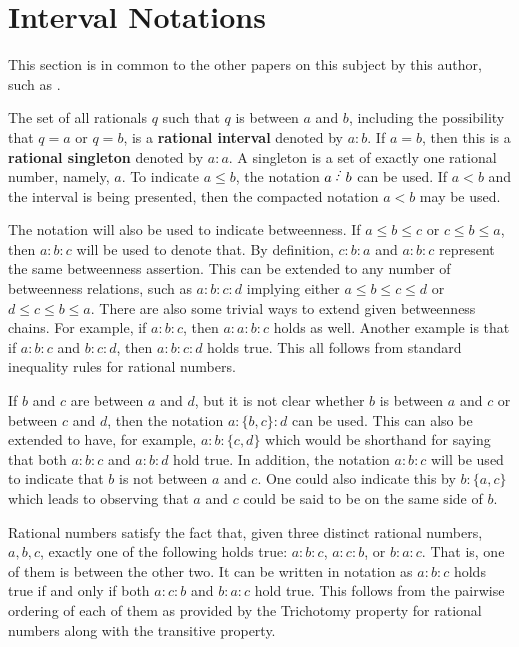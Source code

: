 \documentclass[12pt]{article}
\begin{document}
\section{Interval Notations}

This section is in common to the other papers on this subject by this author, such as \cite{taylor24dedekind}.

The set of all rationals $q$ such that $q$ is between $a$ and $b$, including the possibility that $q=a$ or $q=b$, is a \textbf{rational interval} denoted by $a:b$. If $a=b$, then this is a \textbf{rational singleton} denoted by $a:a$. A singleton is a set of exactly one rational number, namely, $a$. To indicate $a \leq b$, the notation $a \lte b$ can be used. If $a < b$ and the interval is being presented, then the compacted notation $a \lt b$ may be used. 

The notation will also be used to indicate betweenness. If $a \leq b \leq c$ or $c \leq b \leq a$, then $a:b:c$ will be used to denote that. By definition, $c:b:a$ and $a:b:c$ represent the same betweenness assertion. This can be extended to any number of betweenness relations, such as $a:b:c:d$ implying either $a \leq b \leq c \leq d$ or $d \leq c \leq b \leq a$. There are also some trivial ways to extend given betweenness chains. For example, if $a:b:c$, then $a:a:b:c$ holds as well. Another example is that if $a:b:c$ and $b:c:d$, then $a:b:c:d$ holds true. This all follows from standard inequality rules for rational numbers. 

If $b$ and $c$ are between $a$ and $d$, but it is not clear whether $b$ is between $a$ and $c$ or between $c$ and $d$, then the notation $a:\{b,c\}:d$ can be used. This can also be extended to have, for example, $a:b:\{c,d\}$ which would be shorthand for saying that both $a:b:c$ and $a:b:d$ hold true. In addition, the notation \sout{$a:b:c$} will be used to indicate that $b$ is not between $a$ and $c$. One could also indicate this by $b:\{a,c\}$ which leads to observing that $a$ and $c$ could be said to be on the same side of $b$. 

Rational numbers satisfy the fact that, given three distinct rational numbers, $a, b, c$, exactly one of the following holds true: $a:b:c$, $a:c:b$, or $b:a:c$. That is, one of them is between the other two. It can be written in notation as $a:b:c$ holds true if and only if both \sout{$a:c:b$} and \sout{$b:a:c$} hold true. This follows from the pairwise ordering of each of them as provided by the Trichotomy property for rational numbers along with the transitive property. 
\end{document}
